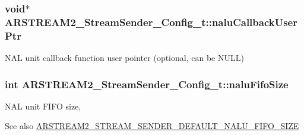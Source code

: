 \subsubsection[{\texorpdfstring{nalu\+Callback\+User\+Ptr}{naluCallbackUserPtr}}]{\setlength{\rightskip}{0pt plus 5cm}void$\ast$ A\+R\+S\+T\+R\+E\+A\+M2\+\_\+\+Stream\+Sender\+\_\+\+Config\+\_\+t\+::nalu\+Callback\+User\+Ptr}\hypertarget{struct_a_r_s_t_r_e_a_m2___stream_sender___config__t_a835e282b611a84128385f25f3a3a5d1d}{}\label{struct_a_r_s_t_r_e_a_m2___stream_sender___config__t_a835e282b611a84128385f25f3a3a5d1d}
N\+AL unit callback function user pointer (optional, can be N\+U\+LL) 
\subsubsection[{\texorpdfstring{nalu\+Fifo\+Size}{naluFifoSize}}]{\setlength{\rightskip}{0pt plus 5cm}int A\+R\+S\+T\+R\+E\+A\+M2\+\_\+\+Stream\+Sender\+\_\+\+Config\+\_\+t\+::nalu\+Fifo\+Size}\hypertarget{struct_a_r_s_t_r_e_a_m2___stream_sender___config__t_a9ed92118d2e8fa364c32b7f160ea3ea8}{}\label{struct_a_r_s_t_r_e_a_m2___stream_sender___config__t_a9ed92118d2e8fa364c32b7f160ea3ea8}
N\+AL unit F\+I\+FO size, \begin{DoxySeeAlso}{See also}
\hyperlink{arstream2__stream__sender_8h_a6c6170420a48511dbee692ead219ba80}{A\+R\+S\+T\+R\+E\+A\+M2\+\_\+\+S\+T\+R\+E\+A\+M\+\_\+\+S\+E\+N\+D\+E\+R\+\_\+\+D\+E\+F\+A\+U\+L\+T\+\_\+\+N\+A\+L\+U\+\_\+\+F\+I\+F\+O\+\_\+\+S\+I\+ZE} 
\end{DoxySeeAlso}
